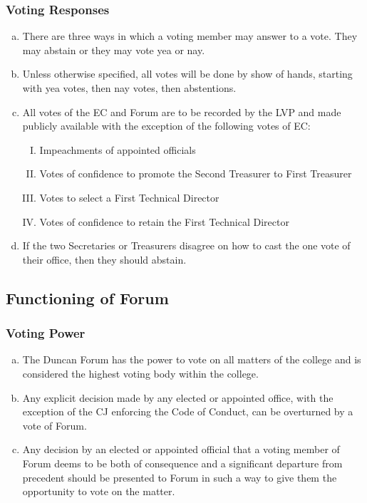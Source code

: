 \documentclass[USletter,12pt]{article}
\begin{document}
\begin{enumerate}[(a)]
\subsubsection{Voting Responses}
\begin{enumerate}[(a)]
\item There are three ways in which a voting member may answer to a vote.  They may abstain or they may vote yea or nay.
\item Unless otherwise specified, all votes will be done by show of hands, starting with yea votes, then nay votes, then abstentions.
\item All votes of the EC and Forum are to be recorded by the LVP and made publicly available with the exception of the following votes of EC:
	\begin{enumerate}[(I)]
	\item Impeachments of appointed officials
	\item Votes of confidence to promote the Second Treasurer to First Treasurer
	\item Votes to select a First Technical Director
	\item Votes of confidence to retain the First Technical Director
	\end{enumerate}
\item If the two Secretaries or Treasurers disagree on how to cast the one vote of their office, then they should abstain.
\end{enumerate}


\subsection{Functioning of Forum}


\subsubsection{Voting Power}
\begin{enumerate}[(a)]
\item The Duncan Forum has the power to vote on all matters of the college and is considered the highest voting body within the college.
\item Any explicit decision made by any elected or appointed office, with the exception of the CJ enforcing the Code of Conduct, can be overturned by a vote of Forum.
\item Any decision by an elected or appointed official that a voting member of Forum deems to be both of consequence and a significant departure from precedent should be presented to Forum in such a way to give them the opportunity to vote on the matter.
\end{enumerate}


\end{enumerate}
\end{document}
